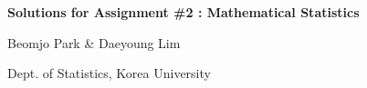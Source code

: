 \documentclass{article}
\begin{document}
\newpage

\begin{minipage}{\columnwidth}
\centering
\textbf{{\LARGE Solutions for Assignment \#2 : Mathematical Statistics}}

\vspace{15pt}
{\Large Beomjo Park \& Daeyoung Lim}

Dept. of Statistics, Korea University
\end{minipage}
\end{document}
